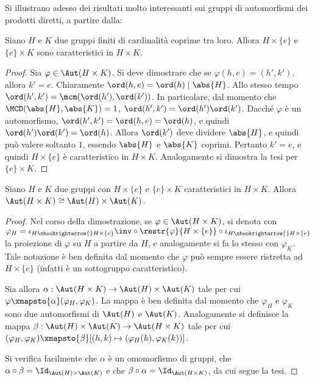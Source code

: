 \documentclass[12pt]{scrartcl}
\begin{document}
	
	Si illustrano adesso dei risultati molto interessanti sui gruppi di automorfismi
	dei prodotti diretti, a partire dalla:
	
	\begin{proposition}
		Siano $H$ e $K$ due gruppi finiti di cardinalità coprime tra loro. Allora
		$H \times \{e\}$ e $\{e\} \times K$ sono caratteristici in $H \times K$.
	\end{proposition}
	
	\begin{proof}
		Sia $\varphi \in \Aut(H \times K)$. Si deve dimostrare che se
		$\varphi(h, e) = (h', k')$, allora $k' = e$. Chiaramente
		$\ord(h, e) = \ord(h) \mid \abs{H}$. Allo stesso tempo
		$\ord(h', k') = \mcm(\ord(h'), \ord(k'))$. In particolare, dal momento
		che $\MCD(\abs{H}, \abs{K}) = 1$, $\ord(h', k') = \ord(h') \ord(k')$.
		Dacché $\varphi$ è un automorfismo, $\ord(h', k') = \ord(h, e) = \ord(h)$, e
		quindi $\ord(h') \ord(k') = \ord(h)$. Allora $\ord(k')$ deve dividere
		$\abs{H}$, e quindi può valere soltanto $1$, essendo $\abs{H}$ e
		$\abs{K}$ coprimi. Pertanto $k' = e$, e quindi $H \times \{e\}$ è caratteristico
		in $H \times K$. Analogamente si dimostra la tesi per $\{e\} \times K$.
	\end{proof}
	
	\begin{proposition}
		Siano $H$ e $K$ due gruppi con $H \times \{e\}$ e $\{e\} \times K$ caratteristici
		in $H \times K$. Allora $\Aut(H \times K) \cong \Aut(H) \times \Aut(K)$.
	\end{proposition}
	
	\begin{proof}
		Nel corso della dimostrazione, se $\varphi \in \Aut(H \times K)$, si
		denota con $\varphi_H = \iota_{H \xhookrightarrow{} H \times \{e\}}\inv \circ \restr{\varphi}{H \times \{e\}} \circ \iota_{H \xhookrightarrow{} H \times \{e\}}$ la proiezione di $\varphi$ su
		$H$ a partire da $H$, e analogamente si fa lo stesso con $\varphi_K$. Tale
		notazione è ben definita dal momento che $\varphi$ può sempre essere ristretta
		ad $H \times \{e\}$ (infatti è un sottogruppo caratteristico). \medskip
		
		
		Sia allora
		$\alpha : \Aut(H \times K) \to \Aut(H) \times \Aut(K)$ tale per cui
		$\varphi \xmapsto{\alpha} (\varphi_H, \varphi_K)$. La mappa è ben
		definita dal momento che $\varphi_H$ e $\varphi_K$ sono due automorfismi
		di $\Aut(H)$ e $\Aut(K)$. Analogamente si definisce la mappa
		$\beta : \Aut(H) \times \Aut(K) \to \Aut(H \times K)$ tale per cui
		$(\varphi_H, \varphi_K) \xmapsto{\beta} [(h, k) \mapsto (\varphi_H(h), \varphi_K(k))]$.
		\medskip
		
		
		Si verifica facilmente che $\alpha$ è un omomorfismo di gruppi, che
		$\alpha \circ \beta = \Id_{\Aut(H) \times \Aut(K)}$ e che
		$\beta \circ \alpha = \Id_{\Aut(H \times K)}$, da cui segue la tesi.
	\end{proof}
	
\end{document}
